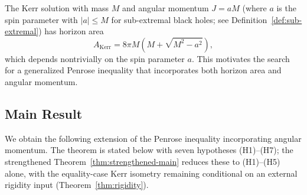 The Kerr solution with mass $M$ and angular momentum $J = aM$ (where $a$ is the spin parameter with $|a| \leq M$ for sub-extremal black holes; see Definition~\ref{def:sub-extremal}) has horizon area
\[
A_{\text{Kerr}} = 8\pi M(M + \sqrt{M^2 - a^2}),
\]
which depends nontrivially on the spin parameter $a$. This motivates the search for a generalized Penrose inequality that incorporates both horizon area and angular momentum.

\subsection{Main Result}

We obtain the following extension of the Penrose inequality incorporating angular momentum. The theorem is stated below with seven hypotheses (H1)--(H7); the strengthened Theorem~\ref{thm:strengthened-main} reduces these to (H1)--(H5) alone, with the equality-case Kerr isometry remaining conditional on an external rigidity input (Theorem~\ref{thm:rigidity}).


